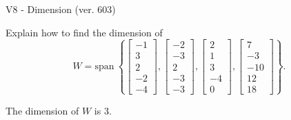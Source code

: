 \begin{exercise}
  \begin{exerciseTitle}V8 - Dimension (ver. 603)\end{exerciseTitle}
  \begin{exerciseStatement}
    Explain how to find the dimension of 
\[W=\mathrm{span}\ \left\{\left[\begin{array}{r}
-1 \\
3 \\
2 \\
-2 \\
-4
\end{array}\right] , \left[\begin{array}{r}
-2 \\
-3 \\
2 \\
-3 \\
-3
\end{array}\right] , \left[\begin{array}{r}
2 \\
1 \\
3 \\
-4 \\
0
\end{array}\right] , \left[\begin{array}{r}
7 \\
-3 \\
-10 \\
12 \\
18
\end{array}\right]\right\}.\]



  \end{exerciseStatement}
  \begin{exerciseAnswer}
   The dimension of \(W\) is  \(3\).
  


  \end{exerciseAnswer}
\end{exercise}